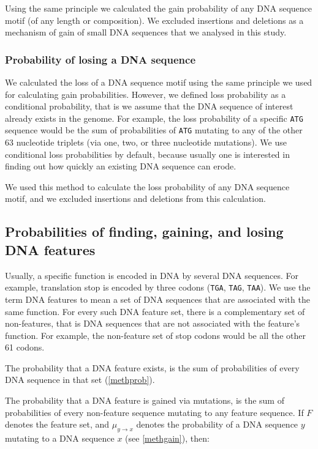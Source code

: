 \documentclass[12pt,a4paper]{article}
\begin{document}
Using the same principle we calculated the gain probability of any DNA sequence motif (of any length or composition). We excluded insertions and deletions as a mechanism of gain of small DNA sequences that we analysed in this study. 


\subsubsection{Probability of losing a DNA sequence}

We calculated the loss of a DNA sequence motif using the same principle we used for calculating gain probabilities. However, we defined loss probability as a conditional probability, that is we assume that the DNA sequence of interest already exists in the genome. For example, the loss probability of a specific \texttt{ATG} sequence would be the sum of probabilities of \texttt{ATG} mutating to any of the other 63 nucleotide triplets (via one, two, or three nucleotide mutations). We use conditional loss probabilities by default, because usually one is interested in finding out how quickly an existing DNA sequence can erode.

We used this method to calculate the loss probability of any DNA sequence motif, and we excluded insertions and deletions from this calculation.

\subsection{Probabilities of finding, gaining, and losing DNA features}
\label{methfeatures}

Usually, a specific function is encoded in DNA by several DNA sequences. For example, translation stop is encoded by three codons (\texttt{TGA}, \texttt{TAG}, \texttt{TAA}). We use the term DNA features to mean a set of DNA sequences that are associated with the same function. For every such DNA feature set, there is a complementary set of non-features, that is DNA sequences that are not associated with the feature's function. For example, the non-feature set of stop codons would be all the other 61 codons. 

The probability that a DNA feature exists, is the sum of probabilities of every DNA sequence in that set (\autoref{methprob}).

The probability that a DNA feature is gained via mutations, is the sum of probabilities of every non-feature sequence mutating to any feature sequence. If $F$ denotes the feature set, and $\mu_{y\to x}$ denotes the probability of a DNA sequence $y$ mutating to a DNA sequence $x$ (see \autoref{methgain}), then:
\end{document}
